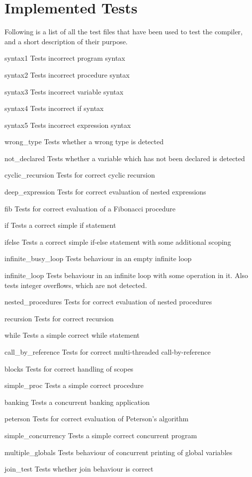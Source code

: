 \documentclass[twoside]{report}
\newenvironment{mycompactdesc}{\begin{adjustwidth}{0.53cm}{}\begin{compactdesc}}{\end{compactdesc}\end{adjustwidth}}
\begin{document}
\section{Implemented Tests}
\label{implemented_tests}
Following is a list of all the test files that have been used to test the compiler, and a short description of their purpose.
\begin{mycompactdesc}
	\item[syntax1] Tests incorrect program syntax
	\item[syntax2] Tests incorrect procedure syntax
	\item[syntax3] Tests incorrect variable syntax
	\item[syntax4] Tests incorrect if syntax
	\item[syntax5] Tests incorrect expression syntax
	\item[wrong\_{}type] Tests whether a wrong type is detected
	\item[not\_{}declared] Tests whether a variable which has not been declared is detected
    \item[cyclic\_{}recursion] Tests for correct cyclic recursion
    \item[deep\_{}expression] Tests for correct evaluation of nested expressions
    \item[fib] Tests for correct evaluation of a Fibonacci procedure 
    \item[if] Tests a correct simple if statement
    \item[ifelse] Tests a correct simple if-else statement with some additional scoping
    \item[infinite\_{}busy\_{}loop] Tests behaviour in an empty infinite loop
    \item[infinite\_{}loop] Tests behaviour in an infinite loop with some operation in it. Also tests integer overflows, which are not detected.
    \item[nested\_{}procedures] Tests for correct evaluation of nested procedures
    \item[recursion] Tests for correct recursion
    \item[while] Tests a simple correct while statement
    \item[call\_{}by\_{}reference] Tests for correct multi-threaded call-by-reference
    \item[blocks] Tests for correct handling of scopes
    \item[simple\_{}proc] Tests a simple correct procedure
	\item[banking] Tests a concurrent banking application
    \item[peterson] Tests for correct evaluation of Peterson's algorithm
    \item[simple\_{}concurrency] Tests a simple correct concurrent program
    \item[multiple\_{}globals] Tests behaviour of concurrent printing of global variables
    \item[join\_{}test] Tests whether join behaviour is correct
\end{mycompactdesc}
\end{document}

